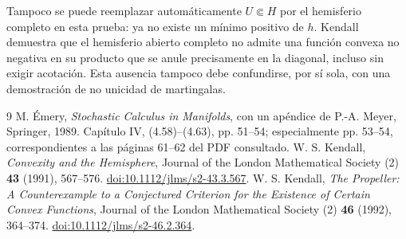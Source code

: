 \documentclass[11pt,a4paper]{article}
\begin{document}
Tampoco se puede reemplazar automáticamente $U\Subset H$ por el hemisferio completo en esta prueba: ya no existe un mínimo positivo de $h$. Kendall \cite{kendall} demuestra que el hemisferio abierto completo no admite una función convexa no negativa en su producto que se anule precisamente en la diagonal, incluso sin exigir acotación. Esta ausencia tampoco debe confundirse, por sí sola, con una demostración de no unicidad de martingalas.

\begin{thebibliography}{9}
M. Émery, \emph{Stochastic Calculus in Manifolds}, con un apéndice de P.-A. Meyer, Springer, 1989. Capítulo IV, (4.58)--(4.63), pp. 51--54; especialmente pp. 53--54, correspondientes a las páginas 61--62 del PDF consultado.
W. S. Kendall, \emph{Convexity and the Hemisphere}, Journal of the London Mathematical Society (2) \textbf{43} (1991), 567--576.
\href{https://doi.org/10.1112/jlms/s2-43.3.567}{doi:10.1112/jlms/s2-43.3.567}.
W. S. Kendall, \emph{The Propeller: A Counterexample to a Conjectured Criterion for the Existence of Certain Convex Functions}, Journal of the London Mathematical Society (2) \textbf{46} (1992), 364--374.
\href{https://doi.org/10.1112/jlms/s2-46.2.364}{doi:10.1112/jlms/s2-46.2.364}.
\end{thebibliography}
\end{document}
